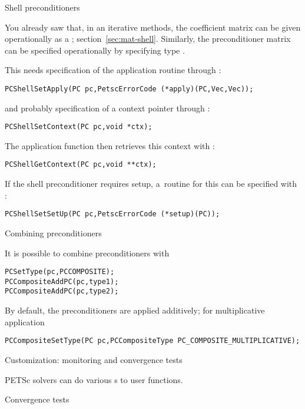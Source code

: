  {Shell preconditioners}

You already saw that,
in an iterative methods, the coefficient matrix can be given operationally
as a ; section~\ref{sec:mat-shell}.
Similarly, the preconditioner matrix can be specified operationally
by specifying type .

This needs specification of the application routine
through :
\begin{lstlisting}
PCShellSetApply(PC pc,PetscErrorCode (*apply)(PC,Vec,Vec));
\end{lstlisting}
and probably specification of a context pointer through
:
\begin{lstlisting}
PCShellSetContext(PC pc,void *ctx);
\end{lstlisting}
The application function then retrieves this context with
:
\begin{lstlisting}
PCShellGetContext(PC pc,void **ctx);
\end{lstlisting}

If the shell preconditioner requires setup, a~routine for this can be specified with
:
\begin{lstlisting}
PCShellSetSetUp(PC pc,PetscErrorCode (*setup)(PC));
\end{lstlisting}

 {Combining preconditioners}

It is possible to combine preconditioners with 
\begin{lstlisting}
PCSetType(pc,PCCOMPOSITE);
PCCompositeAddPC(pc,type1);
PCCompositeAddPC(pc,type2);
\end{lstlisting}
By default, the preconditioners are applied additively;
for multiplicative application
\begin{lstlisting}
PCCompositeSetType(PC pc,PCCompositeType PC_COMPOSITE_MULTIPLICATIVE);
\end{lstlisting}

 {Customization: monitoring and convergence tests}

PETSc solvers can do various s to user functions.

 {Convergence tests}

